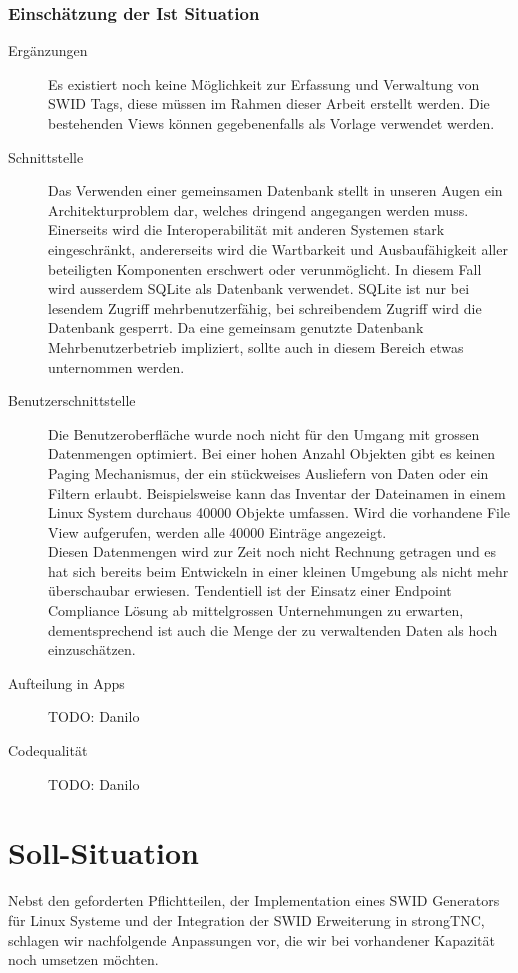 \subsubsection{Einschätzung der Ist Situation}
\begin{description}
	\item[Ergänzungen] Es existiert noch keine Möglichkeit zur Erfassung und
	Verwaltung von SWID Tags, diese müssen im Rahmen dieser Arbeit erstellt werden.
	Die bestehenden Views können gegebenenfalls als Vorlage verwendet werden.
	
	\item[Schnittstelle] Das Verwenden einer gemeinsamen Datenbank stellt in unseren
	Augen ein Architekturproblem dar, welches dringend angegangen werden muss.
	Einerseits wird die Interoperabilität mit anderen Systemen stark eingeschränkt,
	andererseits wird die Wartbarkeit und Ausbaufähigkeit aller beteiligten
	Komponenten erschwert oder verunmöglicht. In diesem Fall wird ausserdem SQLite
	als Datenbank verwendet. SQLite ist nur bei lesendem Zugriff mehrbenutzerfähig,
	bei schreibendem Zugriff wird die Datenbank gesperrt. Da eine gemeinsam
	genutzte Datenbank Mehrbenutzerbetrieb impliziert, sollte auch in diesem Bereich
	etwas unternommen werden. 
	
	\item[Benutzerschnittstelle] Die Benutzeroberfläche wurde noch nicht für den
	Umgang mit grossen Datenmengen optimiert. Bei einer hohen Anzahl Objekten gibt
	es keinen Paging Mechanismus, der ein stückweises Ausliefern von Daten oder ein
	Filtern erlaubt. Beispielsweise kann das Inventar der Dateinamen in einem Linux
	System durchaus 40000 Objekte umfassen. Wird die vorhandene File View
	aufgerufen, werden alle 40000 Einträge angezeigt.\\ 
	Diesen Datenmengen wird zur Zeit noch nicht Rechnung getragen und es hat sich
	bereits beim Entwickeln in einer kleinen Umgebung als nicht mehr überschaubar
	erwiesen. Tendentiell ist
	der Einsatz einer Endpoint Compliance Lösung ab mittelgrossen Unternehmungen zu
	erwarten, dementsprechend ist auch die Menge der zu verwaltenden Daten als hoch
	einzuschätzen.

\item[Aufteilung in Apps] 
	TODO: Danilo
\item[Codequalität]
	TODO: Danilo
	
\end{description}

\section{Soll-Situation}
Nebst den geforderten Pflichtteilen, der Implementation eines SWID Generators
für Linux Systeme und der Integration der SWID Erweiterung in strongTNC,
schlagen wir nachfolgende Anpassungen vor, die wir bei vorhandener Kapazität
noch umsetzen möchten.

